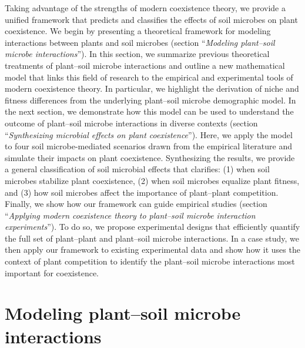 Taking advantage of the strengths of modern coexistence theory, we provide a unified framework that predicts and classifies the effects of soil microbes on plant coexistence.
We begin by presenting a theoretical framework for modeling interactions between plants and soil microbes (section ``\textit{Modeling plant--soil microbe interactions}''). In this section, we summarize previous theoretical treatments of plant--soil microbe interactions and outline a new mathematical model that links this field of research to the empirical and experimental tools of modern coexistence theory. In particular, we highlight the derivation of niche and fitness differences from the underlying plant--soil microbe demographic model.
In the next section, we demonstrate how this model can be used to understand the outcome of plant--soil microbe interactions in diverse contexts (section ``\textit{Synthesizing microbial effects on plant coexistence}''). Here, we apply the model to four soil microbe-mediated scenarios drawn from the empirical literature and simulate their impacts on plant coexistence.
Synthesizing the results, we provide a general classification of soil microbial effects that clarifies: (1) when soil microbes stabilize plant coexistence, (2) when soil microbes equalize plant fitness, and (3) how soil microbes affect the importance of plant--plant competition.
Finally, we show how our framework can guide empirical studies (section ``\textit{Applying modern coexistence theory to plant--soil microbe interaction experiments}''). To do so, we propose experimental designs that efficiently quantify the full set of plant--plant and plant--soil microbe interactions. In a case study, we then apply our framework to existing experimental data and show how it uses the context of plant competition to identify the plant--soil microbe interactions most important for coexistence.
\par



\section{Modeling plant--soil microbe interactions}
